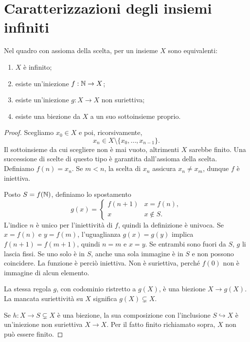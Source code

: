 \section{Caratterizzazioni degli insiemi infiniti}
\begin{teorema}\label{teo:infiniti}
Nel quadro con assioma della scelta, per un insieme $X$ sono equivalenti:
\begin{enumerate}[label=\alph*)]
  \item $X$ è infinito;
  \item esiste un'iniezione $f:\mathbb{N}\to X$;
  \item esiste un'iniezione $g:X\to X$ non suriettiva;
  \item esiste una biezione da $X$ a un suo sottoinsieme proprio.
\end{enumerate}
\end{teorema}
\begin{proof}
 Scegliamo $x_0\in X$ e poi, ricorsivamente,
\[
x_n\in X\setminus\{x_0,\ldots,x_{n-1}\}.
\]
Il sottoinsieme da cui scegliere non è mai vuoto, altrimenti $X$ sarebbe finito. Una successione di scelte di questo tipo è garantita dall'assioma della scelta. Definiamo $f(n)=x_n$. Se $m<n$, la scelta di $x_n$ assicura $x_n\ne x_m$, dunque $f$ è iniettiva.

 Posto $S=f(\mathbb{N})$, definiamo lo spostamento
\[
g(x)=\begin{cases}f(n+1)&x=f(n),\\x&x\notin S.\end{cases}
\]
L'indice $n$ è unico per l'iniettività di $f$, quindi la definizione è univoca. Se $x=f(n)$ e $y=f(m)$, l'uguaglianza $g(x)=g(y)$ implica $f(n+1)=f(m+1)$, quindi $n=m$ e $x=y$. Se entrambi sono fuori da $S$, $g$ li lascia fissi. Se uno solo è in $S$, anche una sola immagine è in $S$ e non possono coincidere. La funzione è perciò iniettiva. Non è suriettiva, perché $f(0)$ non è immagine di alcun elemento.

 La stessa regola $g$, con codominio ristretto a $g(X)$, è una biezione $X\to g(X)$. La mancata suriettività su $X$ significa $g(X)\subsetneq X$.

 Se $h:X\to S\subsetneq X$ è una biezione, la sua composizione con l'inclusione $S\hookrightarrow X$ è un'iniezione non suriettiva $X\to X$. Per il fatto finito richiamato sopra, $X$ non può essere finito.
\end{proof}


